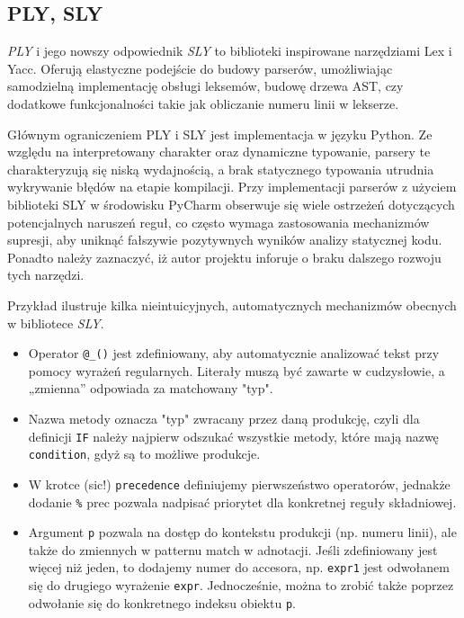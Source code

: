 \subsection{PLY, SLY}
\label{sec:ply-sly}

\textit{PLY}\cite{ply} i jego nowszy odpowiednik \textit{SLY}\cite{sly} to biblioteki inspirowane narzędziami Lex i Yacc. Oferują elastyczne podejście do budowy parserów, umożliwiając samodzielną implementację obsługi leksemów, budowę drzewa AST, czy dodatkowe funkcjonalności takie jak obliczanie numeru linii w lekserze. 

Głównym ograniczeniem PLY i SLY jest implementacja w języku Python. Ze względu na interpretowany charakter oraz dynamiczne typowanie, parsery te charakteryzują się niską wydajnością, a brak statycznego typowania utrudnia wykrywanie błędów na etapie kompilacji. Przy implementacji parserów z użyciem biblioteki SLY w środowisku PyCharm obserwuje się wiele ostrzeżeń dotyczących potencjalnych naruszeń reguł, co często wymaga zastosowania mechanizmów supresji, aby uniknąć fałszywie pozytywnych wyników analizy statycznej kodu. Ponadto należy zaznaczyć, iż autor projektu inforuje o braku dalszego rozwoju tych narzędzi\cite{sly-github}.

Przykład  ilustruje kilka nieintuicyjnych, automatycznych mechanizmów obecnych w bibliotece \textit{SLY}.
\begin{itemize}
    \item Operator \verb|@_()| jest zdefiniowany, aby automatycznie analizować tekst przy pomocy wyrażeń regularnych. Literały muszą być zawarte w cudzysłowie, a „zmienna” odpowiada za matchowany "typ".
    \item Nazwa metody oznacza "typ" zwracany przez daną produkcję, czyli dla definicji \verb|IF| należy najpierw odszukać wszystkie metody, które mają nazwę \verb|condition|, gdyż są to możliwe produkcje. 
    \item W krotce (sic!) \verb|precedence| definiujemy pierwszeństwo operatorów, jednakże dodanie \verb|%| prec pozwala nadpisać priorytet dla konkretnej reguły składniowej.
    \item  Argument \verb|p| pozwala na dostęp do kontekstu produkcji (np. numeru linii), ale także do zmiennych w patternu match  w adnotacji. Jeśli zdefiniowany jest więcej niż jeden, to dodajemy numer do accesora, np. \verb|expr1| jest odwołanem się do drugiego wyrażenie \verb|expr|. Jednocześnie, można to zrobić także poprzez odwołanie się do konkretnego indeksu obiektu \verb|p|.
\end{itemize}

